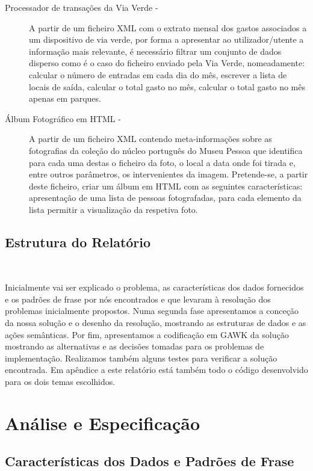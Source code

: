 \documentclass{report}
\begin{document}
\begin{description}
\item[Processador de transa\c{c}\~oes da Via Verde - ] A partir de um ficheiro XML com o extrato mensal dos gastos associados a um dispositivo de via verde,  por forma a apresentar ao utilizador/utente a informa\c{c}\~ao mais relevante, é necessário filtrar um conjunto de dados disperso como é o caso do ficheiro enviado pela Via Verde, nomeadamente: calcular o número de entradas em cada dia do mês, escrever a lista de locais de saída, calcular o total gasto no mês, calcular o total gasto no mês apenas em parques.
\item[Álbum Fotográfico em HTML - ] A partir de um ficheiro XML contendo meta-informa\c{c}\~oes sobre as fotografias da cole\c{c}\~ao do núcleo português do Museu Pessoa que identifica para cada uma destas o ficheiro da foto, o local a data onde foi tirada e, entre outros parâmetros, os intervenientes da imagem. Pretende-se, a partir deste ficheiro, criar um álbum em HTML com as seguintes características: apresenta\c{c}\~ao de uma lista de pessoas fotografadas, para cada elemento da lista permitir a visualiza\c{c}\~ao da respetiva foto.
\end{description}

\section*{Estrutura do Relatório} \

Inicialmente vai ser explicado o problema, as características dos dados fornecidos e os padr\~oes de frase por nós encontrados e que levaram à resolu\c{c}\~ao dos problemas inicialmente propostos.
Numa segunda fase apresentamos a conce\c{c}\~ao da nossa solu\c{c}\~ao e o desenho da resolu\c{c}\~ao, mostrando as estruturas de dados e as a\c{c}\~oes semânticas. Por fim, apresentamos a codifica\c{c}\~ao em GAWK da solu\c{c}\~ao mostrando as alternativas e as decis\~oes tomadas para os problemas de implementa\c{c}\~ao. Realizamos também alguns testes para verificar a solu\c{c}\~ao encontrada. Em apêndice a este relatório está também todo o código desenvolvido para os dois temas escolhidos.

\chapter{Análise e Especifica\c{c}\~ao} \label{ae}

\section{Características dos Dados e Padr\~oes de Frase}
\end{document}
